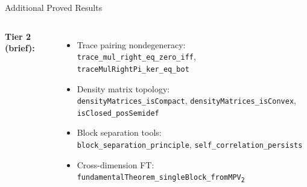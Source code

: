 \documentclass[aspectratio=169,10pt]{beamer}
\begin{document}
\begin{frame}{Additional Proved Results}
\begin{columns}[T]
        \textbf{\textcolor{dimwhite}{Tier 2 (brief):}}
        \begin{itemize}\itemsep0.12em\scriptsize\color{dimwhite}
            \item Trace pairing nondegeneracy:\\
                \texttt{trace\_mul\_right\_eq\_zero\_iff}, \texttt{traceMulRightPi\_ker\_eq\_bot}
            \item Density matrix topology:\\
                \texttt{densityMatrices\_isCompact}, \texttt{densityMatrices\_isConvex}, \texttt{isClosed\_posSemidef}
            \item Block separation tools:\\
                \texttt{block\_separation\_principle}, \texttt{self\_correlation\_persists}
            \item Cross-dimension FT:\\
                \texttt{fundamentalTheorem\_singleBlock\_fromMPV\textsubscript{2}}
        \end{itemize}
    \end{columns}
\end{frame}
\end{document}
